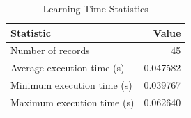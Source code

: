 
\begin{table}[h!]
\centering
\begin{tabular}{l r}
\hline
Statistic & Value \\
\hline
Number of records & 45 \\
Average execution time (s) & 0.047582 \\
Minimum execution time (s) & 0.039767 \\
Maximum execution time (s) & 0.062640 \\
\hline
\end{tabular}
\caption{Learning Time Statistics}
\end{table}
